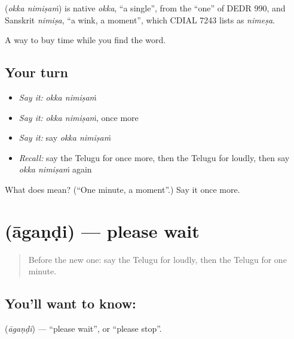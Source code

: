 \begin{cousinweb}
\textbf{ } (\emph{okka nimiṣaṁ}) is native \emph{okka}, \textquotedblleft{}a single\textquotedblright{}, from the \textquotedblleft{}one\textquotedblright{} of DEDR 990, and Sanskrit \emph{nimiṣa}, \textquotedblleft{}a wink, a moment\textquotedblright{}, which CDIAL 7243 lists as \emph{nimeṣa}.
\end{cousinweb}

\begin{grammarlens}[title={What you've built}]
A way to buy time while you find the word.
\end{grammarlens}

\subsection*{Your turn}
\begin{itemize}
\raggedright
  \item \emph{Say it:} \emph{okka nimiṣaṁ}
  \item \emph{Say it:} \emph{okka nimiṣaṁ}, once more
  \item \emph{Say it:} say \emph{okka nimiṣaṁ}
  \item \emph{Recall:} say the Telugu for once more, then the Telugu for loudly, then say \emph{okka nimiṣaṁ} again
\end{itemize}

\begin{tcolorbox}[breakable,colback=teal!4,colframe=teal!35!black,title={Before you move on}]
What does   mean? (\textquotedblleft{}One minute, a moment\textquotedblright{}.) Say it once more.
\end{tcolorbox}
\section[\texorpdfstring{\te{ఆగండి} (āgaṇḍi)}{ఆగండి (āgaṇḍi)}]{ (āgaṇḍi) — please wait}

\label{lesson:TE-C86-wait}



\begin{quote}
Before the new one: say the Telugu for loudly, then the Telugu for one minute.
\end{quote}

\subsection*{You'll want to know: }
\textbf{} (\emph{āgaṇḍi}) — \textquotedblleft{}please wait\textquotedblright{}, or \textquotedblleft{}please stop\textquotedblright{}.

